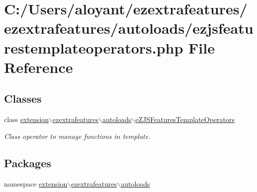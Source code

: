 \hypertarget{ezjsfeaturestemplateoperators_8php}{\section{C\-:/\-Users/aloyant/ezextrafeatures/ezextrafeatures/autoloads/ezjsfeaturestemplateoperators.php File Reference}
\label{ezjsfeaturestemplateoperators_8php}
}
\subsection*{Classes}
\begin{DoxyCompactItemize}
\item 
class \hyperlink{classextension_1_1ezextrafeatures_1_1autoloads_1_1e_z_j_s_features_template_operators}{extension$\backslash$ezextrafeatures$\backslash$autoloads$\backslash$e\-Z\-J\-S\-Features\-Template\-Operators}
\begin{DoxyCompactList}\small\item\em Class operator to manage functions in template. \end{DoxyCompactList}\end{DoxyCompactItemize}
\subsection*{Packages}
\begin{DoxyCompactItemize}
\item 
namespace \hyperlink{namespaceextension_1_1ezextrafeatures_1_1autoloads}{extension$\backslash$ezextrafeatures$\backslash$autoloads}
\end{DoxyCompactItemize}
